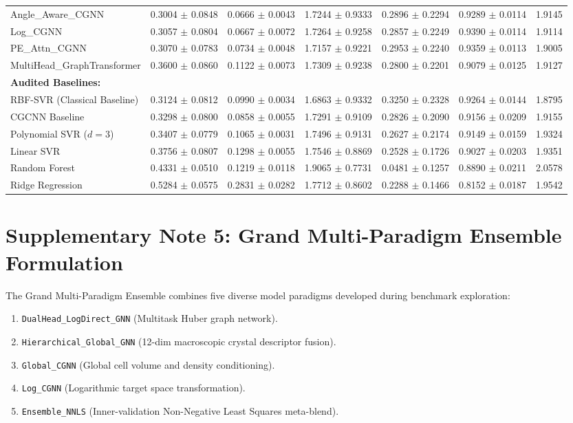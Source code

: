 \documentclass[journal,article,submit,moreauthors,pdftex]{article}
\begin{document}
\begin{table}[htbp]
{\begin{tabular}{lcccccc}
Angle\_Aware\_CGNN & 0.3004 $\pm$ 0.0848 & 0.0666 $\pm$ 0.0043 & 1.7244 $\pm$ 0.9333 & 0.2896 $\pm$ 0.2294 & 0.9289 $\pm$ 0.0114 & 1.9145 \\
Log\_CGNN & 0.3057 $\pm$ 0.0804 & 0.0667 $\pm$ 0.0072 & 1.7264 $\pm$ 0.9258 & 0.2857 $\pm$ 0.2249 & 0.9390 $\pm$ 0.0114 & 1.9114 \\
PE\_Attn\_CGNN & 0.3070 $\pm$ 0.0783 & 0.0734 $\pm$ 0.0048 & 1.7157 $\pm$ 0.9221 & 0.2953 $\pm$ 0.2240 & 0.9359 $\pm$ 0.0113 & 1.9005 \\
MultiHead\_GraphTransformer & 0.3600 $\pm$ 0.0860 & 0.1122 $\pm$ 0.0073 & 1.7309 $\pm$ 0.9238 & 0.2800 $\pm$ 0.2201 & 0.9079 $\pm$ 0.0125 & 1.9127 \\
\midrule
\textbf{Audited Baselines:} \\
RBF-SVR (Classical Baseline) & 0.3124 $\pm$ 0.0812 & 0.0990 $\pm$ 0.0034 & 1.6863 $\pm$ 0.9332 & 0.3250 $\pm$ 0.2328 & 0.9264 $\pm$ 0.0144 & 1.8795 \\
CGCNN Baseline & 0.3298 $\pm$ 0.0800 & 0.0858 $\pm$ 0.0055 & 1.7291 $\pm$ 0.9109 & 0.2826 $\pm$ 0.2090 & 0.9156 $\pm$ 0.0209 & 1.9155 \\
Polynomial SVR ($d=3$) & 0.3407 $\pm$ 0.0779 & 0.1065 $\pm$ 0.0031 & 1.7496 $\pm$ 0.9131 & 0.2627 $\pm$ 0.2174 & 0.9149 $\pm$ 0.0159 & 1.9324 \\
Linear SVR & 0.3756 $\pm$ 0.0807 & 0.1298 $\pm$ 0.0055 & 1.7546 $\pm$ 0.8869 & 0.2528 $\pm$ 0.1726 & 0.9027 $\pm$ 0.0203 & 1.9351 \\
Random Forest & 0.4331 $\pm$ 0.0510 & 0.1219 $\pm$ 0.0118 & 1.9065 $\pm$ 0.7731 & 0.0481 $\pm$ 0.1257 & 0.8890 $\pm$ 0.0211 & 2.0578 \\
Ridge Regression & 0.5284 $\pm$ 0.0575 & 0.2831 $\pm$ 0.0282 & 1.7712 $\pm$ 0.8602 & 0.2288 $\pm$ 0.1466 & 0.8152 $\pm$ 0.0187 & 1.9542 \\
\bottomrule
\end{tabular}%
}
\end{table}

\section*{Supplementary Note 5: Grand Multi-Paradigm Ensemble Formulation}

The Grand Multi-Paradigm Ensemble combines five diverse model paradigms developed during benchmark exploration:
\begin{enumerate}
    \item \texttt{DualHead\_LogDirect\_GNN} (Multitask Huber graph network).
    \item \texttt{Hierarchical\_Global\_GNN} (12-dim macroscopic crystal descriptor fusion).
    \item \texttt{Global\_CGNN} (Global cell volume and density conditioning).
    \item \texttt{Log\_CGNN} (Logarithmic target space transformation).
    \item \texttt{Ensemble\_NNLS} (Inner-validation Non-Negative Least Squares meta-blend).
\end{enumerate}
\end{document}
